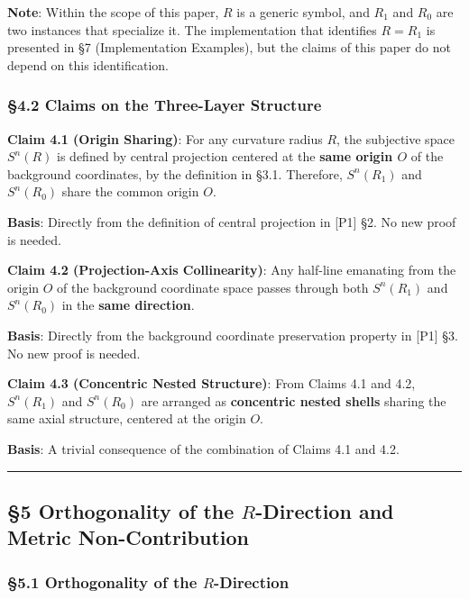 \documentclass[
  a4paper,11pt]{article}
\begin{document}
\textbf{Note}: Within the scope of this paper, \(R\) is a generic
symbol, and \(R_1\) and \(R_0\) are two instances that specialize it.
The implementation that identifies \(R = R_1\) is presented in §7
(Implementation Examples), but the claims of this paper do not depend on
this identification.

\subsubsection{§4.2 Claims on the Three-Layer
Structure}\label{claims-on-the-three-layer-structure}

\textbf{Claim 4.1 (Origin Sharing)}: For any curvature radius \(R\), the
subjective space \(S^n(R)\) is defined by central projection centered at
the \textbf{same origin \(O\)} of the background coordinates, by the
definition in §3.1. Therefore, \(S^n(R_1)\) and \(S^n(R_0)\) share the
common origin \(O\).

\textbf{Basis}: Directly from the definition of central projection in
{[}P1{]} §2. No new proof is needed.

\textbf{Claim 4.2 (Projection-Axis Collinearity)}: Any half-line
emanating from the origin \(O\) of the background coordinate space
passes through both \(S^n(R_1)\) and \(S^n(R_0)\) in the \textbf{same
direction}.

\textbf{Basis}: Directly from the background coordinate preservation
property in {[}P1{]} §3. No new proof is needed.

\textbf{Claim 4.3 (Concentric Nested Structure)}: From Claims 4.1 and
4.2, \(S^n(R_1)\) and \(S^n(R_0)\) are arranged as \textbf{concentric
nested shells} sharing the same axial structure, centered at the origin
\(O\).

\textbf{Basis}: A trivial consequence of the combination of Claims 4.1
and 4.2.

\begin{center}\rule{0.5\linewidth}{0.5pt}\end{center}

\subsection{\texorpdfstring{§5 Orthogonality of the \(R\)-Direction and
Metric
Non-Contribution}{§5 Orthogonality of the R-Direction and Metric Non-Contribution}}\label{orthogonality-of-the-r-direction-and-metric-non-contribution}

\subsubsection{\texorpdfstring{§5.1 Orthogonality of the
\(R\)-Direction}{§5.1 Orthogonality of the R-Direction}}\label{orthogonality-of-the-r-direction}
\end{document}
